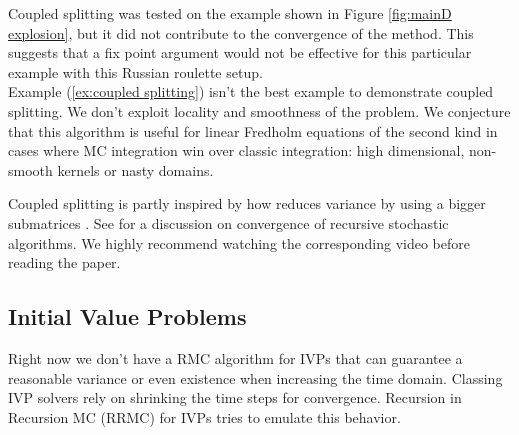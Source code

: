 \documentclass[a4paper,12pt]{article}
\begin{document}
Coupled splitting was tested on the example shown in Figure
\ref{fig:mainD explosion}, but it did not contribute to the
convergence of the method. This suggests that a fix point argument
would not be effective for this particular example with this
Russian roulette setup. \\

Example (\ref{ex:coupled splitting}) isn't the best example to demonstrate
coupled splitting. We don't exploit locality and smoothness of the problem.
We conjecture that this algorithm is useful for
linear Fredholm equations of the second kind in cases where MC integration win
over classic integration: high dimensional, non-smooth kernels or
nasty domains.

\begin{related}
    Coupled splitting is partly inspired by how \cite{sabelfeld_sparsified_2009}
    reduces variance by using a bigger submatrices .
    See \cite{gupta_convergence_2021} for a discussion on convergence
    of recursive stochastic algorithms. We highly recommend watching
    the corresponding video \cite{abhishek_gupta_recursive_2020} before reading
    the paper.
\end{related}


\subsection{Initial Value Problems}

Right now we don't have a RMC algorithm for IVPs that can
guarantee a reasonable variance or even existence when increasing the time domain.
Classing IVP solvers rely on shrinking the time steps for
convergence. Recursion in Recursion MC (RRMC) for IVPs tries to emulate
this behavior.
\end{document}
